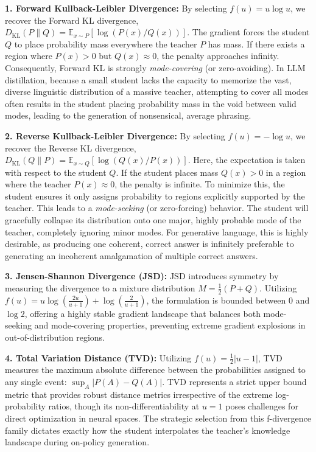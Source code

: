 \textbf{1. Forward Kullback-Leibler Divergence:} By selecting $f(u) = u \log u$, we recover the Forward KL divergence, $D_{\mathrm{KL}}(P \parallel Q) = \mathbb{E}_{x \sim P} [ \log(P(x)/Q(x)) ]$. The gradient forces the student $Q$ to place probability mass everywhere the teacher $P$ has mass. If there exists a region where $P(x) > 0$ but $Q(x) \approx 0$, the penalty approaches infinity. Consequently, Forward KL is strongly \textit{mode-covering} (or zero-avoiding). In LLM distillation, because a small student lacks the capacity to memorize the vast, diverse linguistic distribution of a massive teacher, attempting to cover all modes often results in the student placing probability mass in the void between valid modes, leading to the generation of nonsensical, average phrasing.

\textbf{2. Reverse Kullback-Leibler Divergence:} By selecting $f(u) = -\log u$, we recover the Reverse KL divergence, $D_{\mathrm{KL}}(Q \parallel P) = \mathbb{E}_{x \sim Q} [ \log(Q(x)/P(x)) ]$. Here, the expectation is taken with respect to the student $Q$. If the student places mass $Q(x) > 0$ in a region where the teacher $P(x) \approx 0$, the penalty is infinite. To minimize this, the student ensures it only assigns probability to regions explicitly supported by the teacher. This leads to a \textit{mode-seeking} (or zero-forcing) behavior. The student will gracefully collapse its distribution onto one major, highly probable mode of the teacher, completely ignoring minor modes. For generative language, this is highly desirable, as producing one coherent, correct answer is infinitely preferable to generating an incoherent amalgamation of multiple correct answers.

\textbf{3. Jensen-Shannon Divergence (JSD):} JSD introduces symmetry by measuring the divergence to a mixture distribution $M = \frac{1}{2}(P + Q)$. Utilizing $f(u) = u \log\left(\frac{2u}{u+1}\right) + \log\left(\frac{2}{u+1}\right)$, the formulation is bounded between 0 and $\log 2$, offering a highly stable gradient landscape that balances both mode-seeking and mode-covering properties, preventing extreme gradient explosions in out-of-distribution regions.

\textbf{4. Total Variation Distance (TVD):} Utilizing $f(u) = \frac{1}{2}|u-1|$, TVD measures the maximum absolute difference between the probabilities assigned to any single event: $\sup_{A} |P(A) - Q(A)|$. TVD represents a strict upper bound metric that provides robust distance metrics irrespective of the extreme log-probability ratios, though its non-differentiability at $u=1$ poses challenges for direct optimization in neural spaces. The strategic selection from this f-divergence family dictates exactly how the student interpolates the teacher's knowledge landscape during on-policy generation.

